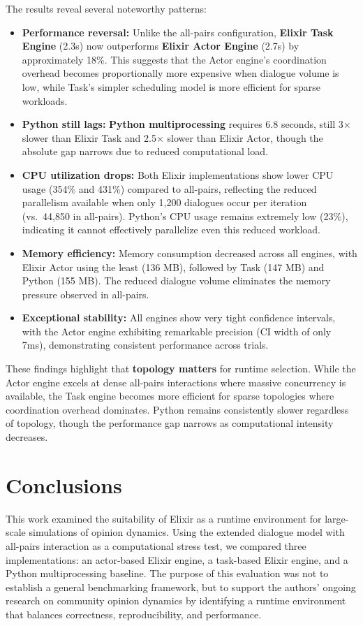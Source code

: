 \documentclass[
]{ceurart}
\begin{document}
The results reveal several noteworthy patterns:
\begin{itemize}
	\item \textbf{Performance reversal:} Unlike the all-pairs configuration, \textbf{Elixir Task Engine} (2.3s) now outperforms \textbf{Elixir Actor Engine} (2.7s) by approximately 18\%. This suggests that the Actor engine's coordination overhead becomes proportionally more expensive when dialogue volume is low, while Task's simpler scheduling model is more efficient for sparse workloads.
	\item \textbf{Python still lags:} \textbf{Python multiprocessing} requires 6.8 seconds, still 3$\times$ slower than Elixir Task and 2.5$\times$ slower than Elixir Actor, though the absolute gap narrows due to reduced computational load.
	\item \textbf{CPU utilization drops:} Both Elixir implementations show lower CPU usage (354\% and 431\%) compared to all-pairs, reflecting the reduced parallelism available when only 1,200 dialogues occur per iteration (vs.\ 44,850 in all-pairs). Python's CPU usage remains extremely low (23\%), indicating it cannot effectively parallelize even this reduced workload.
	\item \textbf{Memory efficiency:} Memory consumption decreased across all engines, with Elixir Actor using the least (136 MB), followed by Task (147 MB) and Python (155 MB). The reduced dialogue volume eliminates the memory pressure observed in all-pairs.
	\item \textbf{Exceptional stability:} All engines show very tight confidence intervals, with the Actor engine exhibiting remarkable precision (CI width of only 7ms), demonstrating consistent performance across trials.
\end{itemize}

These findings highlight that \textbf{topology matters} for runtime selection. While the Actor engine excels at dense all-pairs interactions where massive concurrency is available, the Task engine becomes more efficient for sparse topologies where coordination overhead dominates. Python remains consistently slower regardless of topology, though the performance gap narrows as computational intensity decreases.


\section{Conclusions}

This work examined the suitability of Elixir as a runtime environment for large-scale simulations of opinion dynamics. Using the extended dialogue model with all-pairs interaction as a computational stress test, we compared three implementations: an actor-based Elixir engine, a task-based Elixir engine, and a Python multiprocessing baseline. The purpose of this evaluation was not to establish a general benchmarking framework, but to support the authors' ongoing research on community opinion dynamics by identifying a runtime environment that balances correctness, reproducibility, and performance.
\end{document}
